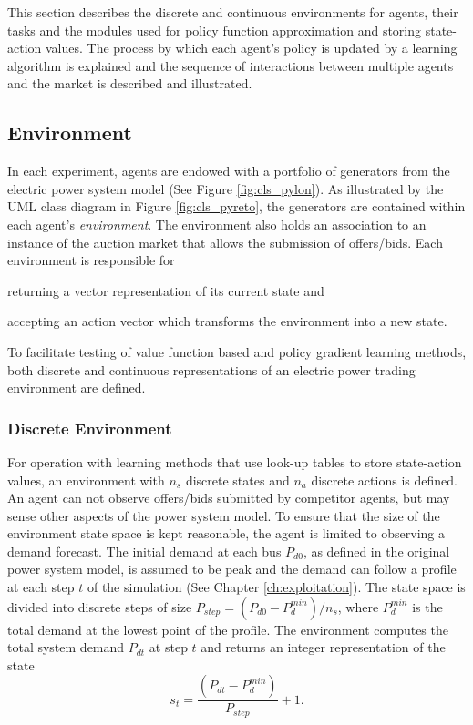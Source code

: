 This section describes the discrete and continuous environments for agents,
their tasks and the modules used for policy function approximation and storing
state-action values.  The process by which each agent's policy is updated by a
learning algorithm is explained and the sequence of interactions between
multiple agents and the market is described and illustrated.

\subsection{Environment}
In each experiment, agents are endowed with a portfolio of generators from the
electric power system model (See Figure \ref{fig:cls_pylon}).  As
illustrated by the UML class diagram in Figure \ref{fig:cls_pyreto},
the generators are contained within each agent's \textit{environment}.  The
environment also holds an association to an instance of the auction market
that allows the submission of offers/bids. Each environment is responsible for \begin{inparaenum}[(i)]
\item returning a vector representation of its current state and \item
accepting an action vector which transforms the environment into a new state.
\end{inparaenum}  To facilitate testing of value function based and policy
gradient learning methods, both discrete and continuous representations of an
electric power trading environment are defined.


\subsubsection{Discrete Environment}
For operation with learning methods that use look-up tables to store
state-action values, an environment with $n_s$ discrete states and $n_a$
discrete actions is defined.  An agent can not observe offers/bids submitted
by competitor agents, but may sense other aspects of the power system
model.  To ensure that the size of the environment state space is
kept reasonable, the agent is limited to observing a demand forecast.  The
initial demand at each bus $P_{d0}$, as defined in the original power system
model, is assumed to be peak and the demand can follow a profile at each
step $t$ of the simulation (See Chapter \ref{ch:exploitation}).  The state
space is divided into discrete steps of size $P_{step} = (P_{d0} - P_d^{min}) /
n_s$, where $P_d^{min}$ is the total demand at the lowest point of the profile.  The
environment computes the total system demand $P_{dt}$ at step $t$ and returns
an integer representation of the state
\begin{equation}
s_t = \frac{(P_{dt} - P_d^{min})}{P_{step}} + 1.
\end{equation}

